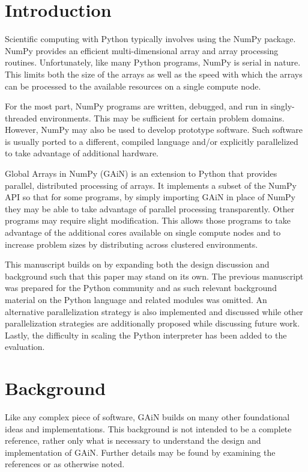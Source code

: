 \documentclass{sigplanconf}
\begin{document}
\section{Introduction}

Scientific computing with Python typically involves using the NumPy package.
NumPy provides an efficient multi-dimensional array and array processing
routines. Unfortunately, like many Python programs, NumPy is serial in nature.
This limits both the size of the arrays as well as the speed with which the
arrays can be processed to the available resources on a single compute node.

For the most part, NumPy programs are written, debugged, and run in
singly-threaded environments. This may be sufficient for certain problem
domains. However, NumPy may also be used to develop prototype software. Such
software is usually ported to a different, compiled language and/or explicitly
parallelized to take advantage of additional hardware.

Global Arrays in NumPy (GAiN) is an extension to Python that provides
parallel, distributed processing of arrays. It implements a subset of the
NumPy API so that for some programs, by simply importing GAiN in place of
NumPy they may be able to take advantage of parallel processing transparently.
Other programs may require slight modification. This allows those programs to
take advantage of the additional cores available on single compute nodes and
to increase problem sizes by distributing across clustered environments.

This manuscript builds on \cite{Dai11} by expanding both the design discussion
and background such that this paper may stand on its own. The previous
manuscript was prepared for the Python community and as such relevant
background material on the Python language and related modules was omitted. An
alternative parallelization strategy is also implemented and discussed while
other parallelization strategies are additionally proposed while discussing
future work. Lastly, the difficulty in scaling the Python interpreter has been
added to the evaluation.

\section{Background}

Like any complex piece of software, GAiN builds on many other foundational
ideas and implementations. This background is not intended to be a complete
reference, rather only what is necessary to understand the design and
implementation of GAiN. Further details may be found by examining the
references or as otherwise noted.
\end{document}
